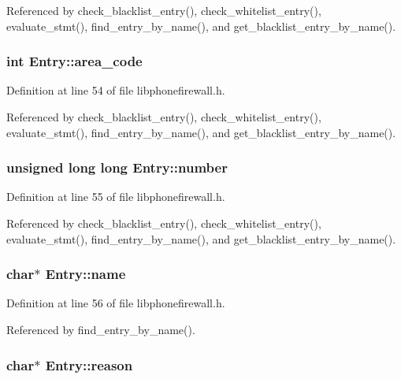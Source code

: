 Referenced by check\_\-blacklist\_\-entry(), check\_\-whitelist\_\-entry(), evaluate\_\-stmt(), find\_\-entry\_\-by\_\-name(), and get\_\-blacklist\_\-entry\_\-by\_\-name().\hypertarget{structEntry_9de7b96e5b65796bd35e9dc730dcd8b3}{
\subsubsection{\setlength{\rightskip}{0pt plus 5cm}int {\bf Entry::area\_\-code}}}
\label{structEntry_9de7b96e5b65796bd35e9dc730dcd8b3}




Definition at line 54 of file libphonefirewall.h.

Referenced by check\_\-blacklist\_\-entry(), check\_\-whitelist\_\-entry(), evaluate\_\-stmt(), find\_\-entry\_\-by\_\-name(), and get\_\-blacklist\_\-entry\_\-by\_\-name().\hypertarget{structEntry_1f2177afed89936f82c130ae13fb107c}{
\subsubsection{\setlength{\rightskip}{0pt plus 5cm}unsigned long long {\bf Entry::number}}}
\label{structEntry_1f2177afed89936f82c130ae13fb107c}




Definition at line 55 of file libphonefirewall.h.

Referenced by check\_\-blacklist\_\-entry(), check\_\-whitelist\_\-entry(), evaluate\_\-stmt(), find\_\-entry\_\-by\_\-name(), and get\_\-blacklist\_\-entry\_\-by\_\-name().\hypertarget{structEntry_272e382d3efed5f970c7939742ec9603}{
\subsubsection{\setlength{\rightskip}{0pt plus 5cm}char$\ast$ {\bf Entry::name}}}
\label{structEntry_272e382d3efed5f970c7939742ec9603}




Definition at line 56 of file libphonefirewall.h.

Referenced by find\_\-entry\_\-by\_\-name().\hypertarget{structEntry_2082cdbb815dfa8b81309cd395d32986}{
\subsubsection{\setlength{\rightskip}{0pt plus 5cm}char$\ast$ {\bf Entry::reason}}}
\label{structEntry_2082cdbb815dfa8b81309cd395d32986}




